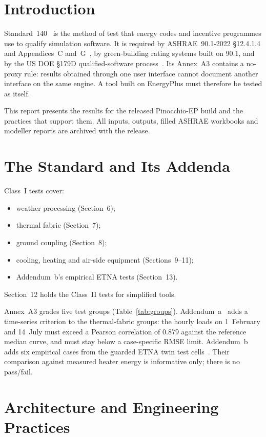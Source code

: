 \documentclass[conference,10pt]{IEEEtran}
\begin{document}
\section{Introduction}
Standard~140~\cite{s140} is the method of test that energy codes and incentive programmes use to qualify simulation
software. It is required by ASHRAE~90.1-2022 \S12.4.1.4 and Appendices~C and~G~\cite{s901}, by green-building
rating systems built on 90.1, and by the US DOE \S179D qualified-software process~\cite{doe179d}. Its Annex~A3
contains a no-proxy rule: results obtained through one user interface cannot document another interface on the
same engine. A tool built on EnergyPlus must therefore be tested as itself.

This report presents the results for the released Pinocchio-EP build and the practices that support them. All
inputs, outputs, filled ASHRAE workbooks and modeller reports are archived with the release.

\section{The Standard and Its Addenda}
Class~I tests cover:
\begin{itemize}
\item weather processing (Section~6);
\item thermal fabric (Section~7);
\item ground coupling (Section~8);
\item cooling, heating and air-side equipment (Sections~9--11);
\item Addendum~b's empirical ETNA tests (Section~13).
\end{itemize}
Section~12 holds the Class~II tests for simplified tools.

Annex~A3 grades five test groups (Table~\ref{tab:groups}). Addendum~a~\cite{s140a} adds a time-series criterion to
the thermal-fabric groups: the hourly loads on 1~February and 14~July must exceed a Pearson correlation of 0.879
against the reference median curve, and must stay below a case-specific RMSE limit. Addendum~b~\cite{s140b} adds
six empirical cases from the guarded ETNA twin test cells~\cite{etna}. Their comparison against measured heater
energy is informative only; there is no pass/fail.

\section{Architecture and Engineering Practices}
\end{document}
